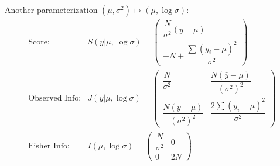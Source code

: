 Another parameterization $ (\mu ,\sigma ^2)\mapsto (\mu ,\log \sigma ) $:
\begin{align}
    \text{Score:}&S(y|\mu ,\log \sigma )= \begin{pmatrix}
        \dfrac{N}{\sigma ^2}(\bar{y}-\mu )\\
        -N+\dfrac{\sum (y_i-\mu )^2 }{\sigma ^2}
    \end{pmatrix}\\
    \text{Observed Info:}&J(y|\mu ,\log\sigma )= \begin{pmatrix}
        \dfrac{N}{\sigma ^2}&\dfrac{N(\bar{y}-\mu )}{(\sigma ^2)^2}\\
        \dfrac{N(\bar{y}-\mu )}{(\sigma ^2)^2}&\dfrac{2\sum (y_i-\mu )^2}{\sigma ^2}
    \end{pmatrix}\\
    \text{Fisher Info:}&I(\mu ,\log \sigma )=\begin{pmatrix}
        \dfrac{N}{\sigma ^2}&0\\
        0&2N
    \end{pmatrix}
\end{align}


